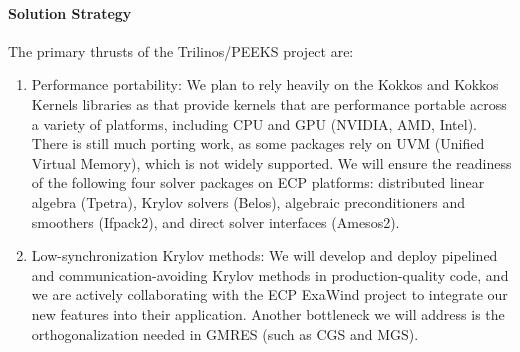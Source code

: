 \paragraph{Solution Strategy}

The primary thrusts of the Trilinos/PEEKS project are:
\begin{enumerate}
  \item Performance portability:
        We plan to rely heavily on the Kokkos and Kokkos Kernels libraries as that provide kernels that are performance portable across a variety of platforms, including CPU and GPU (NVIDIA, AMD, Intel). There is still much porting work, as some packages rely on UVM (Unified Virtual Memory), which is not widely supported.
        We will ensure the readiness of the following four solver packages on ECP platforms:
        distributed linear algebra (Tpetra), Krylov solvers (Belos), algebraic preconditioners and smoothers (Ifpack2), 
        and direct solver interfaces (Amesos2).
  \item Low-synchronization Krylov methods:
    	We will develop and deploy pipelined and 
	communication-avoiding Krylov methods in production-quality code, and 
	we are actively collaborating with the ECP ExaWind project to integrate 
        our new features into their application. Another bottleneck we will address is the orthogonalization needed in GMRES (such as CGS and MGS).
\end{enumerate}

